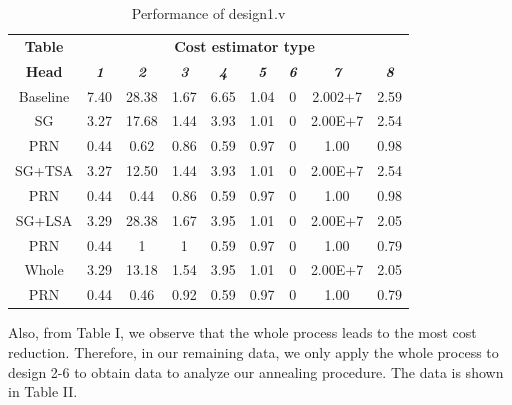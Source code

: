 \documentclass[conference]{IEEEtran}
\begin{document}
\begin{table}[htbp]
\caption{Performance of design1.v}
\begin{center}
\begin{tabular}{|c|c|c|c|c|c|c|c|c|}
\hline
\textbf{Table}&\multicolumn{8}{|c|}{\textbf{Cost estimator type}} \\
\cline{2-9} 
\textbf{Head} & 
\textbf{\textit{1}}& 
\textbf{\textit{2}}&
\textbf{\textit{3}}&
\textbf{\textit{4}}&
\textbf{\textit{5}}&
\textbf{\textit{6}}&
\textbf{\textit{7}}&
\textbf{\textit{8}} \\
\hline
Baseline&7.40&28.38&1.67&6.65&1.04&0&2.002+7&2.59\\
\hline

SG&3.27&17.68&1.44&3.93&1.01 &0 &2.00E+7&2.54\\
\cline{2-9}
PRN&0.44&0.62&0.86&0.59&0.97&0&1.00&0.98\\
\hline

SG+TSA&3.27&12.50&1.44&3.93&1.01 &0 &2.00E+7&2.54\\
\cline{2-9}
PRN&0.44&0.44&0.86&0.59&0.97&0&1.00&0.98\\
\hline

SG+LSA&3.29&28.38&1.67&3.95&1.01&0&2.00E+7&2.05\\
\cline{2-9}
PRN&0.44&1&1&0.59&0.97&0&1.00&0.79\\
\hline

Whole&3.29&13.18&1.54&3.95&1.01&0&2.00E+7&2.05\\
\cline{2-9}
PRN&0.44&0.46&0.92&0.59&0.97&0&1.00&0.79\\
\hline

\end{tabular}
\label{tab1}
\end{center}
\end{table}

Also, from Table I, we observe that the whole process leads to the most cost reduction. Therefore, in our remaining data, we only apply the whole process to design 2-6 to obtain data to analyze our annealing procedure. The data is shown in Table II.
\end{document}
